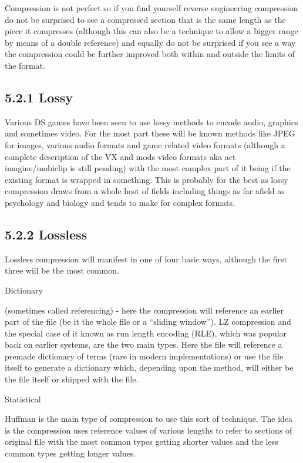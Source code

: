 \documentclass[
]{book}
\begin{document}
Compression is not perfect so if you find yourself reverse engineering compression do not be surprised to see a compressed section that is the same length as the piece it compresses (although this can also be a technique to allow a bigger range by means of a double reference) and equally do not be surprised if you see a way the compression could be further improved both within and outside the limits of the format.

\hypertarget{lossy}{%
\subsection{5.2.1 Lossy}\label{lossy}}

Various DS games have been seen to use lossy methods to encode audio, graphics and sometimes video. For the most part these will be known methods like JPEG for images, various audio formats and game related video formats (although a complete description of the VX and mods video formats aka act imagine/mobiclip is still pending) with the most complex part of it being if the existing format is wrapped in something. This is probably for the best as lossy compression draws from a whole host of fields including things as far afield as psychology and biology and tends to make for complex formats.

\hypertarget{lossless}{%
\subsection{5.2.2 Lossless}\label{lossless}}

Lossless compression will manifest in one of four basic ways, although the first three will be the most common.

Dictionary

(sometimes called referencing) - here the compression will reference an earlier part of the file (be it the whole file or a ``sliding window''). LZ compression and the special case of it known as run length encoding (RLE), which was popular back on earlier systems, are the two main types. Here the file will reference a premade dictionary of terms (rare in modern implementations) or use the file itself to generate a dictionary which, depending upon the method, will either be the file itself or shipped with the file.

Statistical

Huffman is the main type of compression to use this sort of technique. The idea is the compression uses reference values of various lengths to refer to sections of original file with the most common types getting shorter values and the less common types getting longer values.
\end{document}
